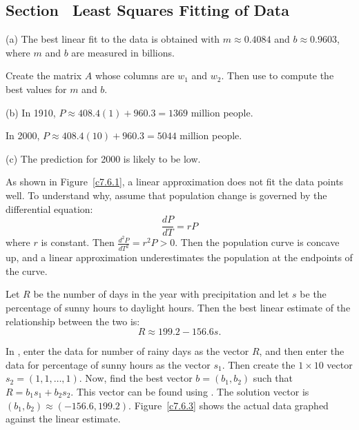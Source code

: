 \documentclass{ximera}
\begin{document}
\subsection*{Section~\protect{\ref{S:7.6}} Least Squares Fitting of Data}

(a) \ans The best linear fit to the data is obtained with $m \approx
0.4084$ and $b \approx 0.9603$, where $m$ and $b$ are measured in
billions.

\soln Create the matrix $A$ whose columns are $w_1$ and $w_2$.  Then use
 to compute the best values for $m$ and $b$.

(b) In 1910, $P \approx 408.4(1) + 960.3 = 1369$ million people.

\para In 2000, $P \approx 408.4(10) + 960.3 = 5044$ million people.

(c) \ans The prediction for 2000 is likely to be low.

\soln As shown in Figure~\ref{c7.6.1}, a linear approximation does not
fit the data points well.  To understand why, assume that population
change is governed by the differential equation:
\[
\frac{dP}{dT} = rP
\]
where $r$ is constant.  Then $\frac{d^2P}{dT^2} = r^2P > 0$.
Then the population curve is concave up, and a linear approximation
underestimates the population at the endpoints of the curve.

\begin{figure}[htb]
		\centerline{%
		}
\end{figure}

\ans Let $R$ be the number of days in the year with precipitation and
let $s$ be the percentage of sunny hours to daylight hours.  Then the
best linear estimate of the relationship between the two is:
\[ R \approx 199.2 - 156.6s. \]

\soln In \Matlabp, enter the data for number of rainy days as the vector
$R$, and then enter the data for percentage of sunny hours as the vector
$s_1$.  Then create the $1 \times 10$ vector $s_2 = (1,1,\dots,1)$.  Now,
find the best vector $b = (b_1,b_2)$ such that $R = b_1s_1 + b_2s_2$. 
This vector can be found using .  The solution vector
is $(b_1,b_2) \approx (-156.6,199.2)$.  Figure~\ref{c7.6.3} shows the
actual data graphed against the linear estimate.

\begin{figure}[htb]
		\centerline{%
		}
\end{figure}
\end{document}
